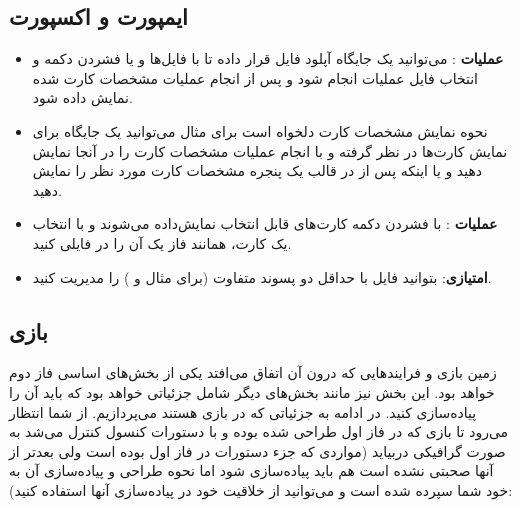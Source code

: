 \documentclass[]{article}
\begin{document}
\subsection*{{\titr ایمپورت و اکسپورت}}
\begin{itemize}
    \item \textbf{عملیات }:
     می‌توانید یک جایگاه آپلود فایل قرار داده تا با  فایل‌ها و یا فشردن دکمه و انتخاب فایل عملیات  انجام شود و پس از انجام عملیات مشخصات کارت  شده نمایش داده شود.
    \item نحوه نمایش مشخصات کارت دلخواه است برای مثال می‌توانید یک جایگاه برای نمایش کارت‌ها در نظر گرفته و با انجام عملیات  مشخصات کارت را در آنجا نمایش دهید و یا اینکه پس از  در قالب یک پنجره  مشخصات کارت مورد نظر را نمایش دهید.
    \item \textbf{عملیات }: با فشردن دکمه  کارت‌های قابل انتخاب نمایش‌داده می‌شوند و با انتخاب یک کارت، همانند فاز یک آن را در فایلی  کنید.
    \item \textbf{امتیازی}: بتوانید فایل با حداقل دو پسوند‌ متفاوت (برای مثال  و ) را مدیریت کنید.
\end{itemize}

\subsection*{{\titr بازی}}
زمین بازی و فرایندهایی که درون آن اتفاق ‌می‌افتد یکی از بخش‌های اساسی فاز دوم خواهد بود. این بخش نیز مانند بخش‌های دیگر شامل جزئیاتی خواهد بود که باید آن را پیاده‌سازی کنید.  در ادامه به جزئیاتی که در بازی هستند می‌پردازیم. از شما انتظار می‌رود تا بازی که در فاز اول طراحی شده بوده و با دستورات کنسول کنترل می‌شد به صورت گرافیکی دربیاید (مواردی که جزء دستورات در فاز اول بوده است ولی بعدتر از آنها صحبتی نشده است هم باید پیاده‌سازی شود اما نحوه طراحی و پیاده‌سازی آن به خود شما سپرده شده است و می‌توانید از خلاقیت خود در پیاده‌سازی آنها استفاده کنید)‌:
\end{document}

